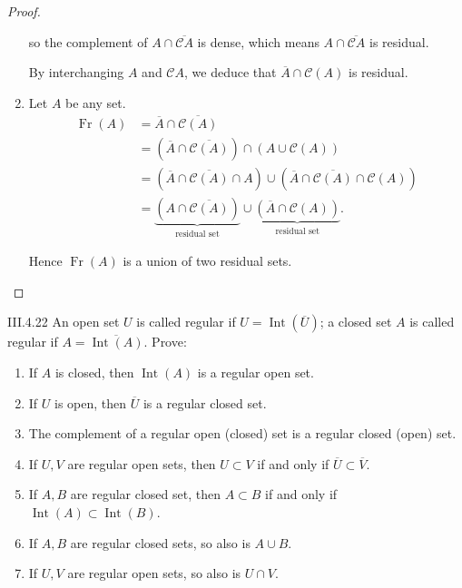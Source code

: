 \begin{proof}
\begin{enumerate}[label={(\arabic*)},itemsep=0pt,leftmargin=*]
              so the complement of \( A \cap \overline{\mathscr{C}A} \) is dense, which means \( A \cap \overline{\mathscr{C}A} \) is residual.

              By interchanging \( A \) and \( \mathscr{C}A \), we deduce that \( \overline{A} \cap \mathscr{C}(A) \) is residual.
        \item Let \(A\) be any set.
              \begingroup
              \allowdisplaybreaks%
              \begin{align*}
                  \operatorname{Fr}(A) & = \overline{A} \cap \overline{\mathscr{C}(A)}                                                                                                       \\
                                       & = (\overline{A} \cap \overline{\mathscr{C}(A)}) \cap (A \cup \mathscr{C}(A))                                                                        \\
                                       & = (\overline{A} \cap \overline{\mathscr{C}(A)} \cap A) \cup (\overline{A} \cap \overline{\mathscr{C}(A)} \cap \mathscr{C}(A))                       \\
                                       & = \underbrace{(A \cap \overline{\mathscr{C}(A)})}_{\text{residual set}} \cup \underbrace{(\overline{A} \cap \mathscr{C}(A))}_{\text{residual set}}.
              \end{align*}
              \endgroup

              Hence \( \operatorname{Fr}(A) \) is a union of two residual sets.
    \end{enumerate}
\end{proof}

\begin{problem}{III.4.22}
An open set \(U\) is called regular if \(U = \operatorname{Int}(\overline{U})\); a closed set \(A\) is called regular if \(A = \overline{\operatorname{Int}(A)}\). Prove:
\begin{enumerate}[leftmargin=*,label={(\alph*)},itemsep=0pt]
    \item If \(A\) is closed, then \(\operatorname{Int}(A)\) is a regular open set.
    \item If \(U\) is open, then \(\overline{U}\) is a regular closed set.
    \item The complement of a regular open (closed) set is a regular closed (open) set.
    \item If \(U, V\) are regular open sets, then \(U \subset V\) if and only if \( \overline{U} \subset \overline{V} \).
    \item If \(A, B\) are regular closed set, then \( A \subset B \) if and only if \( \operatorname{Int}(A) \subset \operatorname{Int}(B) \).
    \item If \(A, B\) are regular closed sets, so also is \(A \cup B\).
    \item If \(U, V\) are regular open sets, so also is \(U \cap V\).
\end{enumerate}
\end{problem}

